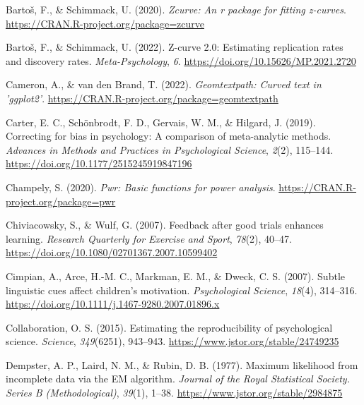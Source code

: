 \documentclass[
  doc, donotrepeattitle,floatsintext]{apa7}
\newlength{\cslhangindent}
\newlength{\cslentryspacingunit} %
\newenvironment{CSLReferences}[2] %
 {%
  \setlength{\parindent}{0pt}
  \ifodd #1
  \let\oldpar\par
  \def\par{\hangindent=\cslhangindent\oldpar}
  \fi
  \setlength{\parskip}{#2\cslentryspacingunit}
 }%
 {}
\begin{document}
\begin{CSLReferences}{1}{0}
\leavevmode{}%
Bartoš, F., \& Schimmack, U. (2020). \emph{Zcurve: An r package for fitting z-curves}. \url{https://CRAN.R-project.org/package=zcurve}

\leavevmode{}%
Bartoš, F., \& Schimmack, U. (2022). Z-curve 2.0: Estimating replication rates and discovery rates. \emph{Meta-Psychology}, \emph{6}. \url{https://doi.org/10.15626/MP.2021.2720}

\leavevmode{}%
Cameron, A., \& van den Brand, T. (2022). \emph{Geomtextpath: Curved text in 'ggplot2'}. \url{https://CRAN.R-project.org/package=geomtextpath}

\leavevmode{}%
Carter, E. C., Schönbrodt, F. D., Gervais, W. M., \& Hilgard, J. (2019). Correcting for bias in psychology: A comparison of meta-analytic methods. \emph{Advances in Methods and Practices in Psychological Science}, \emph{2}(2), 115--144. \url{https://doi.org/10.1177/2515245919847196}

\leavevmode{}%
Champely, S. (2020). \emph{Pwr: Basic functions for power analysis}. \url{https://CRAN.R-project.org/package=pwr}

\leavevmode{}%
Chiviacowsky, S., \& Wulf, G. (2007). Feedback after good trials enhances learning. \emph{Research Quarterly for Exercise and Sport}, \emph{78}(2), 40--47. \url{https://doi.org/10.1080/02701367.2007.10599402}

\leavevmode{}%
Cimpian, A., Arce, H.-M. C., Markman, E. M., \& Dweck, C. S. (2007). Subtle linguistic cues affect children's motivation. \emph{Psychological Science}, \emph{18}(4), 314--316. \url{https://doi.org/10.1111/j.1467-9280.2007.01896.x}

\leavevmode{}%
Collaboration, O. S. (2015). Estimating the reproducibility of psychological science. \emph{Science}, \emph{349}(6251), 943--943. \url{https://www.jstor.org/stable/24749235}

\leavevmode{}%
Dempster, A. P., Laird, N. M., \& Rubin, D. B. (1977). Maximum likelihood from incomplete data via the {EM} algorithm. \emph{Journal of the Royal Statistical Society. Series B (Methodological)}, \emph{39}(1), 1--38. \url{https://www.jstor.org/stable/2984875}


\end{CSLReferences}
\end{document}
